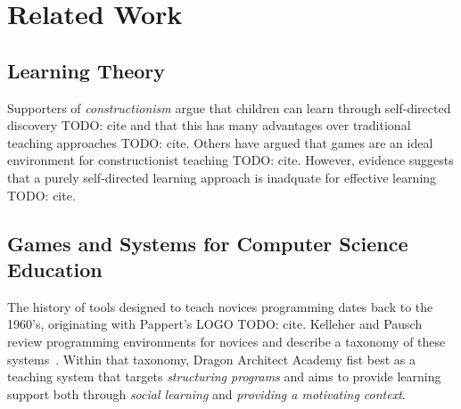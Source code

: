 \documentclass{sig-alternate}
\newcommand{\TODO}[1]{{\color{red} TODO: #1}}
\newcommand{\gametitle}{{\color{RoyalPurple} Dragon Architect Academy}}
\begin{document}



\section{Related Work}

\subsection{Learning Theory}
Supporters of \emph{constructionism} argue that children can learn through self-directed discovery \TODO{cite} and that this has many advantages over traditional teaching approaches \TODO{cite}.
Others have argued that games are an ideal environment for constructionist teaching \TODO{cite}.
However, evidence suggests that a purely self-directed learning approach is inadquate for effective learning \TODO{cite}.

\subsection{Games and Systems for Computer Science Education}
The history of tools designed to teach novices programming dates back to the 1960's, originating with Pappert's LOGO \TODO{cite}.
Kelleher and Pausch review programming environments for novices and describe a taxonomy of these systems~\cite{kelleher2005lowering}.
Within that taxonomy, \gametitle{} fist best as a teaching system that targets \emph{structuring programs} and aims to provide learning support both through \emph{social learning} and \emph{providing a motivating context}.
\end{document}
